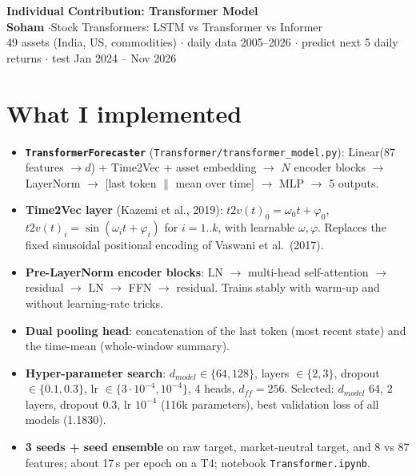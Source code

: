 \documentclass[10pt,a4paper]{article}
\begin{document}
\begin{center}
{\Large\bfseries Individual Contribution: Transformer Model}\\[2pt]
\textbf{Soham} \quad$\cdot$\quad Stock Transformers: LSTM vs Transformer vs Informer\\[1pt]
\small 49 assets (India, US, commodities) $\cdot$ daily data 2005--2026 $\cdot$ predict next 5 daily returns $\cdot$ test Jan 2024 -- Nov 2026
\end{center}

\section{What I implemented}
\begin{itemize}
  \item \textbf{\texttt{TransformerForecaster}} (\texttt{Transformer/transformer\_model.py}): Linear(87 features $\to d$) + Time2Vec + asset embedding $\to$ $N$ encoder blocks $\to$ LayerNorm $\to$ [last token $\|$ mean over time] $\to$ MLP $\to$ 5 outputs.
  \item \textbf{Time2Vec layer} (Kazemi et al., 2019): $t2v(t)_0=\omega_0t+\varphi_0$, \ $t2v(t)_i=\sin(\omega_it+\varphi_i)$ for $i=1..k$, with learnable $\omega,\varphi$. Replaces the fixed sinusoidal positional encoding of Vaswani et al.\ (2017).
  \item \textbf{Pre-LayerNorm encoder blocks}: LN $\to$ multi-head self-attention $\to$ residual $\to$ LN $\to$ FFN $\to$ residual. Trains stably with warm-up and without learning-rate tricks.
  \item \textbf{Dual pooling head}: concatenation of the last token (most recent state) and the time-mean (whole-window summary).
  \item \textbf{Hyper-parameter search}: $d_{model}\in\{64,128\}$, layers $\in\{2,3\}$, dropout $\in\{0.1,0.3\}$, lr $\in\{3\cdot10^{-4},10^{-4}\}$, 4 heads, $d_{ff}=256$. Selected: $d_{model}$ 64, 2 layers, dropout 0.3, lr $10^{-4}$ (116k parameters), best validation loss of all models (1.1830).
  \item \textbf{3 seeds + seed ensemble} on raw target, market-neutral target, and 8 vs 87 features; about 17\,s per epoch on a T4; notebook \texttt{Transformer.ipynb}.
\end{itemize}
\end{document}
